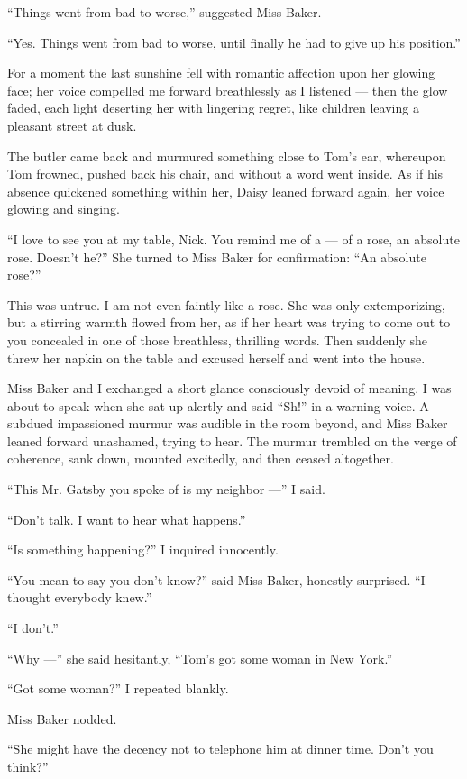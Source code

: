 \documentclass{znotebook}
\begin{document}
``Things went from bad to worse,'' suggested Miss Baker.

``Yes. Things went from bad to worse, until finally he had to give up his position.''

For a moment the last sunshine fell with romantic affection upon her glowing face; her voice compelled me forward breathlessly as I listened ---{} then the glow faded, each light deserting her with lingering regret, like children leaving a pleasant street at dusk.

The butler came back and murmured something close to Tom's ear, whereupon Tom frowned, pushed back his chair, and without a word went inside. As if his absence quickened something within her, Daisy leaned forward again, her voice glowing and singing.

``I love to see you at my table, Nick. You remind me of a ---{} of a rose, an absolute rose. Doesn't he?'' She turned to Miss Baker for confirmation: ``An absolute rose?''

This was untrue. I am not even faintly like a rose. She was only extemporizing, but a stirring warmth flowed from her, as if her heart was trying to come out to you concealed in one of those breathless, thrilling words. Then suddenly she threw her napkin on the table and excused herself and went into the house.

Miss Baker and I exchanged a short glance consciously devoid of meaning. I was about to speak when she sat up alertly and said ``Sh!'' in a warning voice. A subdued impassioned murmur was audible in the room beyond, and Miss Baker leaned forward unashamed, trying to hear. The murmur trembled on the verge of coherence, sank down, mounted excitedly, and then ceased altogether.

``This Mr. Gatsby you spoke of is my neighbor ---'' I said.

``Don't talk. I want to hear what happens.''

``Is something happening?'' I inquired innocently.

``You mean to say you don't know?'' said Miss Baker, honestly surprised. ``I thought everybody knew.''

``I don't.''

``Why ---'' she said hesitantly, ``Tom's got some woman in New York.''

``Got some woman?'' I repeated blankly.

Miss Baker nodded.

``She might have the decency not to telephone him at dinner time. Don't you think?''
\end{document}
